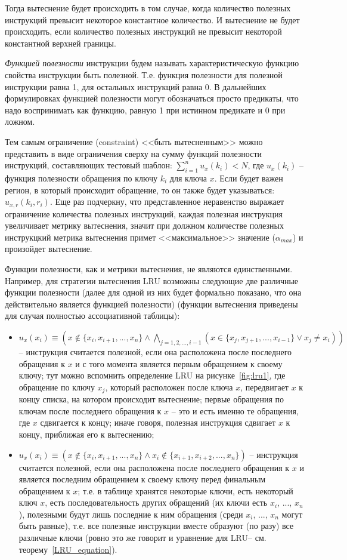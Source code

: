 \documentclass[14pt]{extreport}
\newcommand{\LRU}{\textsf{LRU}\xspace}
\begin{document}
Тогда вытеснение будет происходить в том случае, когда количество
полезных инструкций превысит некоторое константное количество.
И вытеснение не будет происходить, если количество полезных инструкций
не превысит некоторой константной верхней границы.

\emph{Функцией полезности} инструкции будем называть характеристическую функцию
свойства инструкции быть полезной. Т.е. функция полезности для полезной
инструкции равна 1, для остальных инструкций равна 0. В дальнейших формулировках
функцией полезности могут обозначаться просто предикаты, что надо воспринимать
как функцию, равную 1 при истинном предикате и 0 при ложном.

Тем самым ограничение (constraint) <<быть вытесненным>> можно представить в виде
ограничения сверху на сумму функций полезности инструкций, составляющих тестовый
шаблон: $\sum_{i=1}^n u_x(k_i) < N$, где $u_x(k_i)$ -- функция полезности
обращения по ключу $k_i$ для ключа $x$. Если будет важен регион, в который
происходит обращение, то он также будет указываться: $u_{x,r}(k_i, r_i)$. Еще
раз подчеркну, что представленное неравенство выражает ограничение количества
полезных инструкций, каждая полезная инструкция увеличивает метрику вытеснения,
значит при должном количестве полезных инструкцкий метрика вытеснения примет
<<максимальное>> значение ($\alpha_{max}$) и произойдет вытеснение.

Функции полезности, как и метрики вытеснения, не являются единственными.
Например, для стратегии вытеснения \LRU возможны следующие две различные функции
полезности (далее для одной из них будет формально показано, что она
действительно является функцией полезности) (функции вытеснения приведены для
случая полностью ассоциативной таблицы):
\begin{itemize}
  \item $u_x(x_i) \equiv (x \notin \{x_i, x_{i+1}, ..., x_n\} \wedge
\bigwedge\limits_{j=1,2,...,i-1} (x \in \{x_j, x_{j+1}, ..., x_{i-1}\} \vee x_j
\neq x_i))$ -- инструкция считается полезной, если она расположена после
последнего обращения к $x$ и с того момента является первым обращением к своему
ключу; тут можно вспомнить определение \LRU на рисунке~\ref{fig:lru1}, где
обращение по ключу $x_j$, который расположен после ключа $x$, передвигает $x$ к
концу списка, на котором происходит вытеснение; первые обращения по ключам после
последнего обращения к $x$ -- это и есть именно те обращения, где $x$ сдвигается
к концу; иначе говоря, полезная инструкция сдвигает $x$ к концу, приближая его к
вытеснению;
  \item $u_x(x_i) \equiv (x \notin \{x_i, x_{i+1}, ..., x_n\} \wedge x_i \notin
\{x_{i+1}, x_{i+2}, ..., x_n\})$ -- инструкция считается полезной, если она
расположена после последнего обращения к $x$ и является последним обращением к
своему ключу перед финальным обращением к $x$; т.е. в таблице хранятся некоторые
ключи, есть некоторый ключ $x$, есть последовательность других обращений (их
ключи есть $x_i$, ..., $x_n$), полезными будут лишь последние к ним обращения
(среди $x_i$, ..., $x_n$ могут быть равные), т.е. все полезные инструкции вместе
образуют (по разу) все различные ключи (ровно это же говорит и уравнение для
\LRU -- см. теорему~\ref{LRU_equation}).
\end{itemize}
\end{document}
